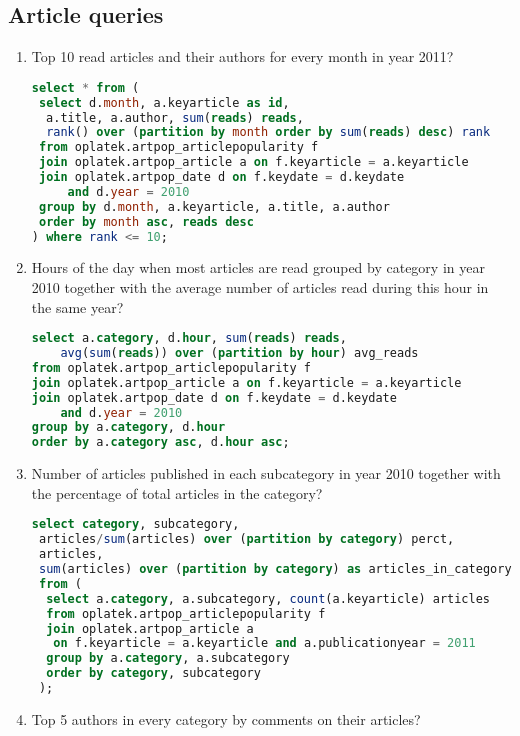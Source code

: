 \subsection*{Article queries} %
\label{sub:Article  queries}
\begin{enumerate}
\item    Top 10 read articles and their authors for every month in year 2011?
\begin{lstlisting}[language=sql] 
select * from (
 select d.month, a.keyarticle as id, 
  a.title, a.author, sum(reads) reads, 
  rank() over (partition by month order by sum(reads) desc) rank 
 from oplatek.artpop_articlepopularity f
 join oplatek.artpop_article a on f.keyarticle = a.keyarticle
 join oplatek.artpop_date d on f.keydate = d.keydate 
     and d.year = 2010
 group by d.month, a.keyarticle, a.title, a.author
 order by month asc, reads desc
) where rank <= 10;
\end{lstlisting}
\item    Hours of the day when most articles are read grouped by category in year 2010 together with the average number of articles read during this hour in the same year?
\begin{lstlisting}[language=sql] 
select a.category, d.hour, sum(reads) reads, 
    avg(sum(reads)) over (partition by hour) avg_reads 
from oplatek.artpop_articlepopularity f
join oplatek.artpop_article a on f.keyarticle = a.keyarticle
join oplatek.artpop_date d on f.keydate = d.keydate 
    and d.year = 2010
group by a.category, d.hour
order by a.category asc, d.hour asc;
\end{lstlisting}
\item    Number of articles published in each subcategory in year 2010 together with the percentage of total articles in the category?
\begin{lstlisting}[language=sql] 
select category, subcategory, 
 articles/sum(articles) over (partition by category) perct, 
 articles, 
 sum(articles) over (partition by category) as articles_in_category 
 from (
  select a.category, a.subcategory, count(a.keyarticle) articles
  from oplatek.artpop_articlepopularity f
  join oplatek.artpop_article a 
   on f.keyarticle = a.keyarticle and a.publicationyear = 2011
  group by a.category, a.subcategory
  order by category, subcategory
 );
\end{lstlisting}
\item    Top 5 authors in every category by comments on their articles?
\begin{lstlisting}[language=sql] 

\end{lstlisting}
\end{enumerate}
